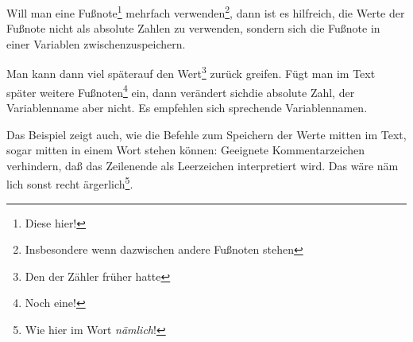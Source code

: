 \documentclass[a5paper]{article}
\begin{document}


Will man eine Fußnote\footnote{Diese hier!}\setcounter{merker}{\value{footnote}}
mehrfach verwenden\footnote{Insbesondere wenn dazwischen andere Fußnoten stehen},
dann ist es hilfreich, die Werte der Fußnote nicht als absolute Zahlen zu verwenden,
sondern sich die Fußnote in einer Variablen zwischenzuspeichern.

Man kann dann viel später\footnotemark[\value{merker}] auf den Wert\footnote{Den
der Zähler früher hatte} zurück%
\setcounter{beispiel}{\value{footnote}}%
greifen. Fügt man im Text später weitere Fußnoten\footnote{Noch eine!} ein,
dann verändert sich\footnotemark[\value{beispiel}] die absolute Zahl,
der Variablenname aber nicht. Es empfehlen sich sprechende Variablennamen.

Das Beispiel zeigt auch, wie die Befehle zum Speichern der Werte mitten im Text,
sogar mitten in einem Wort stehen können: Geeignete Kommentarzeichen verhindern,
daß das Zeilenende als Leerzeichen interpretiert wird. Das wäre näm
\setcounter{beispiel}{34}lich
sonst recht ärgerlich\footnote[\value{beispiel}]{Wie hier im Wort \textit{nämlich}!}.
\end{document}

